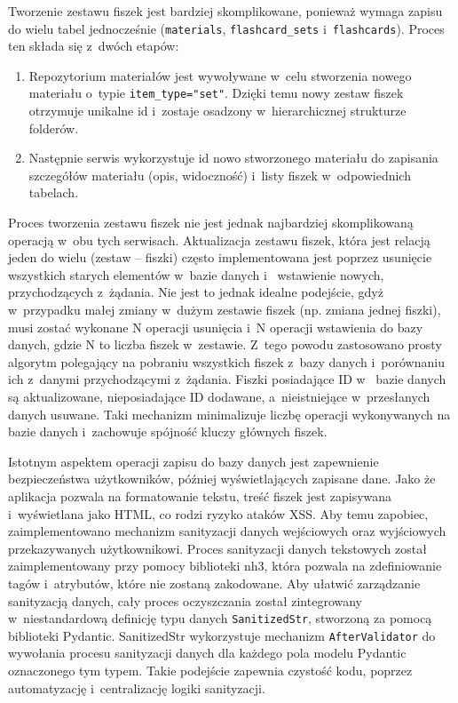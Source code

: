 Tworzenie zestawu fiszek jest bardziej skomplikowane, ponieważ wymaga zapisu do wielu tabel jednocześnie (\texttt{materials}, 
\texttt{flashcard\_sets} i~\texttt{flashcards}). Proces ten składa się z~dwóch etapów:
\begin{enumerate}
    \item Repozytorium materiałów jest wywoływane w~celu stworzenia nowego materiału o~typie \texttt{item\_type="set"}. Dzięki temu 
    nowy zestaw fiszek otrzymuje unikalne id i~zostaje osadzony w~hierarchicznej strukturze folderów.
    \item Następnie serwis wykorzystuje id nowo stworzonego materiału do zapisania szczegółów materiału (opis, widoczność) i~listy fiszek
    w~odpowiednich tabelach.
\end{enumerate} 

Proces tworzenia zestawu fiszek nie jest jednak najbardziej skomplikowaną operacją w~obu tych serwisach. Aktualizacja zestawu fiszek, która 
jest relacją jeden do wielu (zestaw -- fiszki) często implementowana jest poprzez usunięcie wszystkich starych elementów w~bazie danych i~
wstawienie nowych, przychodzących z~żądania. Nie jest to jednak idealne podejście, gdyż w~przypadku małej zmiany w~dużym zestawie fiszek (np. zmiana jednej fiszki), 
musi zostać wykonane N operacji usunięcia i~N operacji wstawienia do bazy danych, gdzie N to liczba fiszek w~zestawie. Z~tego powodu zastosowano 
prosty algorytm polegający na pobraniu wszystkich fiszek z~bazy danych i~porównaniu ich z~danymi przychodzącymi z~żądania. Fiszki posiadające ID w~
bazie danych są aktualizowane, nieposiadające ID dodawane, a~nieistniejące w~przesłanych danych usuwane. Taki mechanizm minimalizuje liczbę operacji 
wykonywanych na bazie danych i~zachowuje spójność kluczy głównych fiszek.

Istotnym aspektem operacji zapisu do bazy danych jest zapewnienie bezpieczeństwa użytkowników, później wyświetlających zapisane dane. 
Jako że aplikacja pozwala na formatowanie tekstu, treść fiszek jest zapisywana i~wyświetlana jako HTML, co rodzi ryzyko ataków XSS. 
Aby temu zapobiec, zaimplementowano mechanizm sanityzacji danych wejściowych oraz wyjściowych przekazywanych użytkownikowi. Proces 
sanityzacji danych tekstowych został zaimplementowany przy pomocy biblioteki nh3, która pozwala na zdefiniowanie tagów i~atrybutów, 
które nie zostaną zakodowane. Aby ułatwić zarządzanie sanityzacją danych, cały proces oczyszczania został 
zintegrowany w~niestandardową definicję typu danych \texttt{SanitizedStr}, stworzoną za pomocą biblioteki Pydantic. SanitizedStr 
wykorzystuje mechanizm \texttt{AfterValidator} do wywołania procesu sanityzacji danych dla każdego pola modelu Pydantic oznaczonego 
tym typem. Takie podejście zapewnia czystość kodu, poprzez automatyzację i~centralizację logiki sanityzacji.

